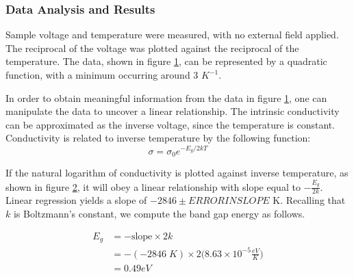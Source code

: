\documentclass[a4paper]{article}
\begin{document}
\subsubsection{Data Analysis and Results}
\qq Sample voltage and temperature were measured, with no external field applied. The reciprocal of the voltage was plotted against the 
reciprocal of the temperature. The data, shown in figure \ref{task23plot}, can be represented by a quadratic function, with a minimum occurring around 3 $K^{-1}$.

\begin{figure}[H]
\centering
\label{task23plot}
\end{figure}

In order to obtain meaningful information from the data in figure \ref{task23plot}, one can manipulate the data to uncover a linear relationship. The intrinsic conductivity can be approximated as the inverse voltage, since the temperature is constant. Conductivity is related to inverse temperature by the following function:
$$\sigma = \sigma_0 e^{-E_g/2kT}$$

\begin{figure}[H]
\centering
\label{task23plotLINEAR}
\end{figure}

If the natural logarithm of conductivity is plotted against inverse temperature, as shown in figure \ref{task23plotLINEAR}, it will obey 
a linear relationship with slope equal to $- \frac{E_g}{2k}$. Linear regression yields a slope of $-2846 \pm ERRORINSLOPE$ K. Recalling that $k$ is Boltzmann's constant, we compute the band gap energy as follows.

\begin{align*}
E_g &= - \text{slope} \times 2k \\
    &= - (-2846 \; K) \times 2 
       \Big( 8.63 \times 10^{-5} \frac{eV}{K} \Big) \\
    &= 0.49 eV \\
\end{align*}
\end{document}
